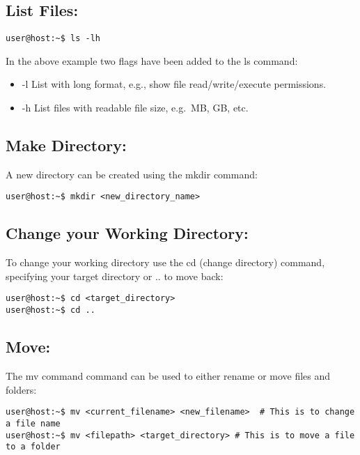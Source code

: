 \documentclass[
]{book}
\providecommand{\tightlist}{%
  \setlength{\itemsep}{0pt}\setlength{\parskip}{0pt}}
\begin{document}
\hypertarget{list-files}{%
\subsection{List Files:}\label{list-files}}

\begin{verbatim}
user@host:~$ ls -lh
\end{verbatim}

In the above example two flags have been added to the ls command:

\begin{itemize}
\tightlist
\item
  -l List with long format, e.g., show file read/write/execute permissions.
\item
  -h List files with readable file size, e.g.~MB, GB, etc.
\end{itemize}

\hypertarget{make-directory}{%
\subsection{Make Directory:}\label{make-directory}}

A new directory can be created using the mkdir command:

\begin{verbatim}
user@host:~$ mkdir <new_directory_name>
\end{verbatim}

\hypertarget{change-your-working-directory}{%
\subsection{Change your Working Directory:}\label{change-your-working-directory}}

To change your working directory use the cd (change directory) command, specifying your target directory or .. to move back:

\begin{verbatim}
user@host:~$ cd <target_directory>
user@host:~$ cd ..
\end{verbatim}

\hypertarget{move}{%
\subsection{Move:}\label{move}}

The mv command command can be used to either rename or move files and folders:

\begin{verbatim}
user@host:~$ mv <current_filename> <new_filename>  # This is to change a file name
user@host:~$ mv <filepath> <target_directory> # This is to move a file to a folder
\end{verbatim}
\end{document}
